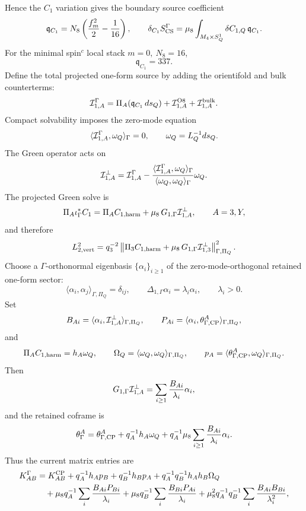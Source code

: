 \documentclass[11pt]{article}
\theoremstyle{definition}
\theoremstyle{remark}
\begin{document}
Hence the \(C_1\) variation gives the boundary source coefficient
\[
  \mathfrak q_{C_1}
  =
  N_8\left(\frac{f_m^2}{2}-\frac{1}{16}\right),
  \qquad
  \delta_{C_1}S_{\rm CS}^{\Gamma}
  =
  \mu_8\int_{M_4\times S^1_Q}
  \delta C_{1,Q}\,\mathfrak q_{C_1}.
\]
For the minimal spin\(^c\) local stack \(m=0,\ N_8=16\),
\[
  \mathfrak q_{C_1}=337.
\]
Define the total projected one-form source by adding the orientifold and bulk
counterterms:
\[
  {\cal I}_{1,A}^{\Gamma}
  =
  \Pi_A(\mathfrak q_{C_1}\,ds_Q)
  +{\cal I}_{1,A}^{\rm O8}
  +{\cal I}_{1,A}^{\rm bulk}.
\]
Compact solvability imposes the zero-mode equation
\[
  \langle{\cal I}_{1,A}^{\Gamma},\omega_Q\rangle_\Gamma=0,
  \qquad
  \omega_Q=L_Q^{-1}ds_Q .
\]
The Green operator acts on
\[
  {\cal I}_{1,A}^{\perp}
  =
  {\cal I}_{1,A}^{\Gamma}
  -
  \frac{\langle{\cal I}_{1,A}^{\Gamma},\omega_Q\rangle_\Gamma}
       {\langle\omega_Q,\omega_Q\rangle_\Gamma}\omega_Q .
\]
The projected Green solve is
\[
  \Pi_A\iota_\Gamma^*C_1
  =
  \Pi_A C_{1,{\rm harm}}
  +
  \mu_8\,G_{1,\Gamma}{\cal I}_{1,A}^{\perp},
  \qquad A=3,Y,
\]
and therefore
\[
  L_{2,{\rm vert}}^2
  =
  q_3^{-2}
  \left\|
  \Pi_3 C_{1,{\rm harm}}
  +
  \mu_8\,G_{1,\Gamma}{\cal I}_{1,3}^{\perp}
  \right\|_{\Gamma,\Pi_Q}^2 .
\]
Choose a \(\Gamma\)-orthonormal eigenbasis
\(\{\alpha_i\}_{i\ge1}\) of the zero-mode-orthogonal retained one-form
sector:
\[
  \langle\alpha_i,\alpha_j\rangle_{\Gamma,\Pi_Q}=\delta_{ij},
  \qquad
  \Delta_{1,\Gamma}\alpha_i=\lambda_i\alpha_i,
  \qquad
  \lambda_i>0 .
\]
Set
\[
  B_{Ai}=\langle\alpha_i,{\cal I}_{1,A}^{\perp}\rangle_{\Gamma,\Pi_Q},
  \qquad
  P_{Ai}=\langle\alpha_i,\theta_{\Gamma,{\rm CP}}^A\rangle_{\Gamma,\Pi_Q},
\]
and
\[
  \Pi_A C_{1,{\rm harm}}=h_A\omega_Q,
  \qquad
  \Omega_Q=\langle\omega_Q,\omega_Q\rangle_{\Gamma,\Pi_Q},
  \qquad
  p_A=\langle\theta_{\Gamma,{\rm CP}}^A,\omega_Q\rangle_{\Gamma,\Pi_Q}.
\]
Then
\[
  G_{1,\Gamma}{\cal I}_{1,A}^{\perp}
  =
  \sum_{i\ge1}\frac{B_{Ai}}{\lambda_i}\alpha_i ,
\]
and the retained coframe is
\[
  \theta_\Gamma^A
  =
  \theta_{\Gamma,{\rm CP}}^A
  +q_A^{-1}h_A\omega_Q
  +q_A^{-1}\mu_8
  \sum_{i\ge1}\frac{B_{Ai}}{\lambda_i}\alpha_i .
\]
Thus the current matrix entries are
\[
\begin{aligned}
  K_{AB}^\Gamma
  &=
  K_{AB}^{\rm CP}
  +q_A^{-1}h_Ap_B
  +q_B^{-1}h_Bp_A
  +q_A^{-1}q_B^{-1}h_Ah_B\Omega_Q\\
  &\quad
  +\mu_8 q_A^{-1}\sum_i\frac{B_{Ai}P_{Bi}}{\lambda_i}
  +\mu_8 q_B^{-1}\sum_i\frac{B_{Bi}P_{Ai}}{\lambda_i}
  +\mu_8^2q_A^{-1}q_B^{-1}
  \sum_i\frac{B_{Ai}B_{Bi}}{\lambda_i^2},
\end{aligned}
\]
\end{document}
